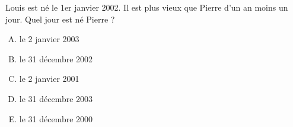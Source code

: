 Louis est né le 1er janvier 2002. Il est plus vieux que Pierre d'un an moins un jour. Quel jour
est né Pierre ?
\begin{multicols}{3}
  \begin{enumerate}[A)]
  \item le 2 janvier 2003
  \item le 31 décembre 2002
  \item le 2 janvier 2001
  \item le 31 décembre 2003
  \item le 31 décembre 2000
  \end{enumerate}
\end{multicols}